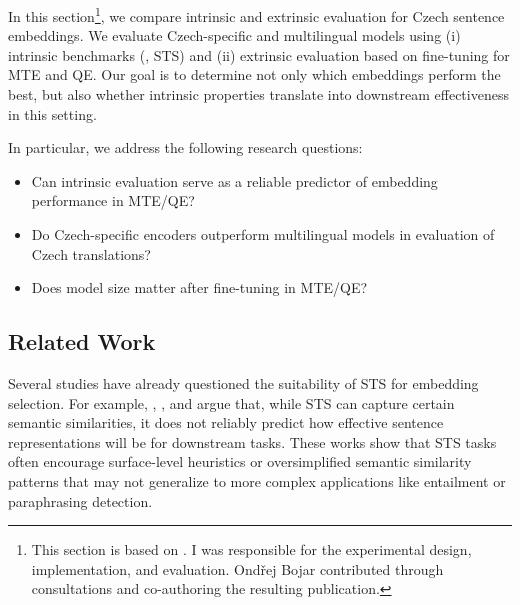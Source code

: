 
In this section\footnote{This section is based on \cite{barancikova-bojar-2025-intrinsic}. I was responsible for the experimental design, implementation, and evaluation. Ond\v{r}ej Bojar contributed through consultations and co-authoring the resulting publication.}, we compare intrinsic and extrinsic evaluation for Czech sentence embeddings. We evaluate Czech-specific and multilingual models using (i) intrinsic benchmarks (\costra, STS) and (ii) extrinsic evaluation based on \comet fine-tuning for MTE and QE. Our goal is to determine not only which embeddings perform the best, but also whether intrinsic properties translate into downstream effectiveness in this setting.

\pagebreak

\begin{mdframed}[
    linecolor=gray,
    linewidth=2pt,
    roundcorner=5,
    backgroundcolor=gray!5
]
\noindent
In particular, we address the following research questions:
\begin{itemize}
    \item Can intrinsic evaluation serve as a reliable predictor of embedding performance in MTE/QE?
    \item Do Czech-specific encoders outperform multilingual models in evaluation of Czech translations?
    \item Does model size matter after fine-tuning in MTE/QE?
\end{itemize}
\end{mdframed}

\subsection{Related Work}
\label{extrinsic:rw}
Several studies have already questioned the suitability of STS for embedding selection. For example, \cite{reimers-etal-2016-task}, \cite{pitfalls2019}, and \cite{zhelezniak-etal-2019-correlation} argue that, while STS can capture certain semantic similarities, it does not reliably predict how effective sentence representations will be for downstream tasks. These works show that STS tasks often encourage surface-level heuristics or oversimplified semantic similarity patterns that may not generalize to more complex applications like entailment or paraphrasing detection. 


